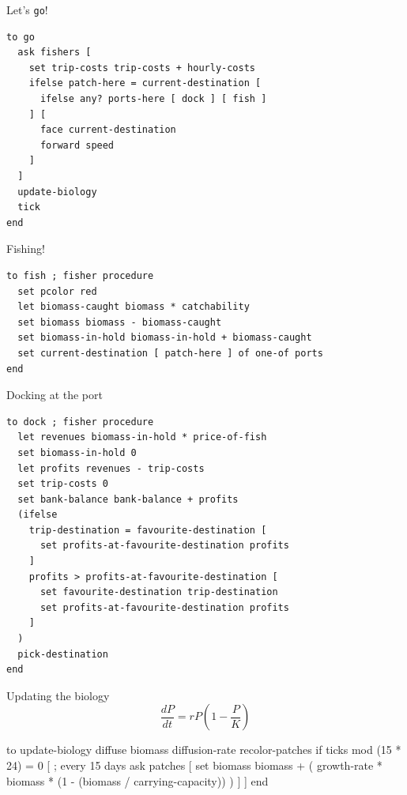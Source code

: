 \documentclass[table, 14pt, aspectratio=169]{beamer}
\begin{document}
\begin{frame}[fragile=singleslide]{Let's \texttt{go}!}
  \begin{adjustbox}{max height=0.8\textheight, max width = \linewidth}
    \begin{verbatim}
to go
  ask fishers [
    set trip-costs trip-costs + hourly-costs
    ifelse patch-here = current-destination [
      ifelse any? ports-here [ dock ] [ fish ]
    ] [
      face current-destination
      forward speed
    ]
  ]
  update-biology
  tick
end
    \end{verbatim}
  \end{adjustbox}
\end{frame}

\begin{frame}[fragile=singleslide]{Fishing!}
  \begin{adjustbox}{max height=0.8\textheight, max width = \linewidth}
    \begin{verbatim}
to fish ; fisher procedure
  set pcolor red
  let biomass-caught biomass * catchability
  set biomass biomass - biomass-caught
  set biomass-in-hold biomass-in-hold + biomass-caught
  set current-destination [ patch-here ] of one-of ports
end
    \end{verbatim}
  \end{adjustbox}
\end{frame}

\begin{frame}[fragile=singleslide]{Docking at the port}
  \begin{adjustbox}{max height=0.8\textheight, max width = \linewidth}
    \begin{verbatim}
to dock ; fisher procedure
  let revenues biomass-in-hold * price-of-fish
  set biomass-in-hold 0
  let profits revenues - trip-costs
  set trip-costs 0
  set bank-balance bank-balance + profits
  (ifelse
    trip-destination = favourite-destination [
      set profits-at-favourite-destination profits
    ]
    profits > profits-at-favourite-destination [
      set favourite-destination trip-destination
      set profits-at-favourite-destination profits
    ]
  )
  pick-destination
end
    \end{verbatim}
  \end{adjustbox}
\end{frame}


\begin{frame}[fragile=singleslide]{Updating the biology}
  \vfill
  $$\frac{dP}{dt}=r P \left(1 - \frac{P}{K}\right)$$
  \vfill
  \begin{adjustbox}{max width=\linewidth}
    \begin{nlogo}
to update-biology
  diffuse biomass diffusion-rate
  recolor-patches
  if ticks mod (15 * 24) = 0 [ ; every 15 days
    ask patches [
      set biomass biomass + (
        growth-rate * biomass * (1 - (biomass / carrying-capacity))
      )
    ]
  ]
end
    \end{nlogo}
  \end{adjustbox}
\end{frame}
\end{document}
